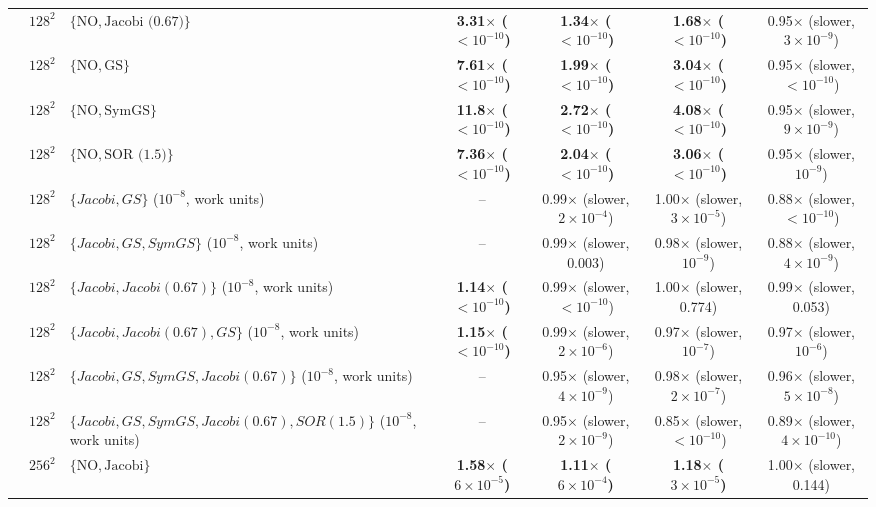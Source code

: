 {\begin{tabular}{lllcccc}
 & $128^2$ & $\{\mathrm{NO}, \text{Jacobi (0.67)}\}$ & \textbf{3.31$\times$ ($<10^{-10}$)} & \textbf{1.34$\times$ ($<10^{-10}$)} & \textbf{1.68$\times$ ($<10^{-10}$)} & 0.95$\times$ (slower, $3\times10^{-9}$) \\
 & $128^2$ & $\{\mathrm{NO}, \text{GS}\}$ & \textbf{7.61$\times$ ($<10^{-10}$)} & \textbf{1.99$\times$ ($<10^{-10}$)} & \textbf{3.04$\times$ ($<10^{-10}$)} & 0.95$\times$ (slower, $<10^{-10}$) \\
 & $128^2$ & $\{\mathrm{NO}, \text{SymGS}\}$ & \textbf{11.8$\times$ ($<10^{-10}$)} & \textbf{2.72$\times$ ($<10^{-10}$)} & \textbf{4.08$\times$ ($<10^{-10}$)} & 0.95$\times$ (slower, $9\times10^{-9}$) \\
 & $128^2$ & $\{\mathrm{NO}, \text{SOR (1.5)}\}$ & \textbf{7.36$\times$ ($<10^{-10}$)} & \textbf{2.04$\times$ ($<10^{-10}$)} & \textbf{3.06$\times$ ($<10^{-10}$)} & 0.95$\times$ (slower, $10^{-9}$) \\
 & $128^2$ & $\{Jacobi, GS\}$ ($10^{-8}$, work units) & -- & 0.99$\times$ (slower, $2\times10^{-4}$) & 1.00$\times$ (slower, $3\times10^{-5}$) & 0.88$\times$ (slower, $<10^{-10}$) \\
 & $128^2$ & $\{Jacobi, GS, SymGS\}$ ($10^{-8}$, work units) & -- & 0.99$\times$ (slower, 0.003) & 0.98$\times$ (slower, $10^{-9}$) & 0.88$\times$ (slower, $4\times10^{-9}$) \\
 & $128^2$ & $\{Jacobi, Jacobi (0.67)\}$ ($10^{-8}$, work units) & \textbf{1.14$\times$ ($<10^{-10}$)} & 0.99$\times$ (slower, $<10^{-10}$) & 1.00$\times$ (slower, 0.774) & 0.99$\times$ (slower, 0.053) \\
 & $128^2$ & $\{Jacobi, Jacobi (0.67), GS\}$ ($10^{-8}$, work units) & \textbf{1.15$\times$ ($<10^{-10}$)} & 0.99$\times$ (slower, $2\times10^{-6}$) & 0.97$\times$ (slower, $10^{-7}$) & 0.97$\times$ (slower, $10^{-6}$) \\
 & $128^2$ & $\{Jacobi, GS, SymGS, Jacobi (0.67)\}$ ($10^{-8}$, work units) & -- & 0.95$\times$ (slower, $4\times10^{-9}$) & 0.98$\times$ (slower, $2\times10^{-7}$) & 0.96$\times$ (slower, $5\times10^{-8}$) \\
 & $128^2$ & $\{Jacobi, GS, SymGS, Jacobi (0.67), SOR (1.5)\}$ ($10^{-8}$, work units) & -- & 0.95$\times$ (slower, $2\times10^{-9}$) & 0.85$\times$ (slower, $<10^{-10}$) & 0.89$\times$ (slower, $4\times10^{-10}$) \\
 & $256^2$ & $\{\mathrm{NO}, \text{Jacobi}\}$ & \textbf{1.58$\times$ ($6\times10^{-5}$)} & \textbf{1.11$\times$ ($6\times10^{-4}$)} & \textbf{1.18$\times$ ($3\times10^{-5}$)} & 1.00$\times$ (slower, 0.144) \\

\end{tabular}}
